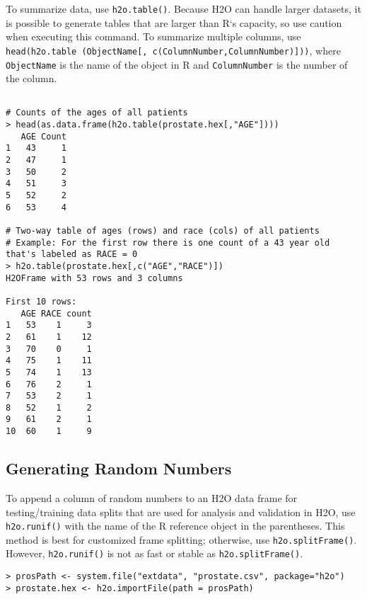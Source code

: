 {{To summarize data, use {\texttt{h2o.table()}}. Because H2O can handle larger datasets, it is possible to generate tables that are larger than R`s capacity, so use caution when executing this command.
To summarize multiple columns, use {\texttt{head(h2o.table (ObjectName[, c(ColumnNumber,ColumnNumber)]))}}, where {\texttt{ObjectName}} is the name of the object in R and {\texttt{ColumnNumber}} is the number of the column.

\waterExampleInR
\medskip
\begin{lstlisting}[style=R]

# Counts of the ages of all patients
> head(as.data.frame(h2o.table(prostate.hex[,"AGE"])))
   AGE Count
1   43     1
2   47     1
3   50     2
4   51     3
5   52     2
6   53     4

# Two-way table of ages (rows) and race (cols) of all patients
# Example: For the first row there is one count of a 43 year old that's labeled as RACE = 0
> h2o.table(prostate.hex[,c("AGE","RACE")])
H2OFrame with 53 rows and 3 columns

First 10 rows:
   AGE RACE count
1   53    1     3
2   61    1    12
3   70    0     1
4   75    1    11
5   74    1    13
6   76    2     1
7   53    2     1
8   52    1     2
9   61    2     1
10  60    1     9
\end{lstlisting}

\subsection{Generating Random Numbers}

To append a column of random numbers to an H2O data frame for testing/training data splits that are used for analysis and validation in H2O, use {\texttt{h2o.runif()}} with the name of the R reference object in the parentheses. This method is best for customized frame splitting; otherwise, use {\texttt{h2o.splitFrame()}}. However, {\texttt{h2o.runif()}} is not as fast or stable as {\texttt{h2o.splitFrame()}}.

\waterExampleInR
\medskip
\begin{lstlisting}[style=R]
> prosPath <- system.file("extdata", "prostate.csv", package="h2o")
> prostate.hex <- h2o.importFile(path = prosPath)


\end{lstlisting}}}
